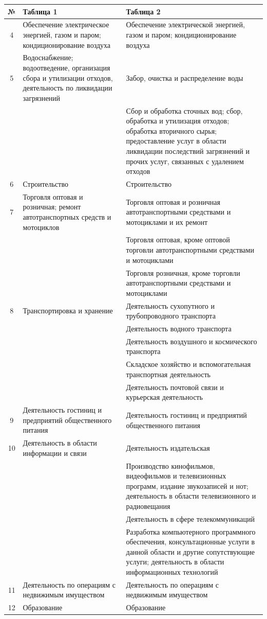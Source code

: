 \documentclass[12pt, a4paper]{article}
\begin{document}
\begin{tabular}[t]{|c|p{6cm}|p{9cm}|}
\hline
	№ & Таблица 1 & Таблица 2\\
\hline
4 & Обеспечение электрическое энергией, газом и паром; кондиционирование воздуха & Обеспечение электрической энергией, газом и паром; кондиционирование воздуха\\ \cline{1-3}
5 & Водоснабжение; водоотведение, организация сбора и утилизации отходов, деятельность по ликвидации загрязнений & Забор, очистка и распределение воды\\ \cline{3-3}
&& Сбор и обработка сточных вод; сбор, обработка и утилизация отходов; обработка вторичного сырья; предоставление услуг в области ликвидации последствий загрязнений и прочих услуг, связанных с удалением отходов \\ \cline{1-3}
6 & Строительство & Строительство\\ \cline{1-3}
7 & Торговля оптовая и розничная; ремонт автотранспортных средств и мотоциклов & Торговля оптовая и розничная автотранспортными средствами и мотоциклами и их ремонт\\ \cline{3-3}
&& Торговля оптовая,  кроме оптовой торговли автотранспортными средствами и мотоциклами \\ \cline{3-3}
&& Торговля розничная, кроме торговли автотранспортными средствами и мотоциклами \\ \cline{1-3}
8 & Транспортировка и хранение & Деятельность сухопутного и трубопроводного транспорта\\ \cline{3-3}
&& Деятельность водного транспорта \\ \cline{3-3}
&& Деятельность воздушного и космического транспорта\\ \cline{3-3}
&& Складское хозяйство и вспомогательная транспортная деятельность \\ \cline{3-3}
&& Деятельность почтовой связи и курьерская деятельность \\ \cline{1-3}
9 & Деятельность гостиниц и предприятий общественного питания & Деятельность гостиниц и предприятий общественного питания\\ \cline{1-3}
10 & Деятельность в области информации и связи & Деятельность издательская\\ \cline{3-3}
&& Производство кинофильмов, видеофильмов и телевизионных программ, издание звукозаписей и нот; деятельность в области телевизионного и радиовещания \\ \cline{3-3}
&& Деятельность в сфере телекоммуникаций \\ \cline{3-3}
&& Разработка компьютерного программного обеспечения, консультационные услуги в данной области и другие сопутствующие услуги; деятельность в области информационных технологий \\ \cline{1-3}
11 & Деятельность по операциям с недвижимым имуществом & Деятельность по операциям с недвижимым имуществом\\ \cline{1-3}
12 & Образование & Образование\\ \cline{1-3}
\end{tabular}
\end{document}

